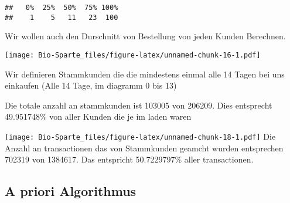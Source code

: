 \documentclass[]{article}
\begin{document}
\begin{verbatim}
##   0%  25%  50%  75% 100% 
##    1    5   11   23  100
\end{verbatim}

Wir wollen auch den Durschnitt von Bestellung von jeden Kunden
Berechnen.

\texttt{[image: Bio-Sparte\_files/figure-latex/unnamed-chunk-16-1.pdf]}

Wir definieren Stammkunden die die mindestens einmal alle 14 Tagen bei
uns einkaufen (Alle 14 Tage, im diagramm 0 bis 13)

Die totale anzahl an stammkunden ist 103005 von 206209. Dies entsprecht
49.951748\% von aller Kunden die je im laden waren

\texttt{[image: Bio-Sparte\_files/figure-latex/unnamed-chunk-18-1.pdf]}
Die Anzahl an transactionen das von Stammkunden geamcht wurden
entsprechen 702319 von 1384617. Das entspricht 50.7229797\% aller
transactionen.

\hypertarget{a-priori-algorithmus}{%
\subsection{A priori Algorithmus}\label{a-priori-algorithmus}}
\end{document}

